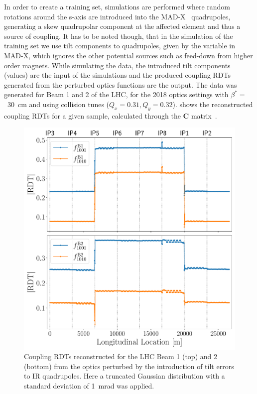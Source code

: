 In order to create a training set, simulations are performed where random rotations around the s-axis are introduced into the MAD-X~\cite{MADX_guide} quadrupoles, generating a skew quadrupolar component at the affected element and thus a source of coupling.
It has to be noted though, that in the simulation of the training set we use tilt components to quadrupoles, given by the \DPSI variable in MAD-X, which ignores the other potential sources such as feed-down from higher order magnets.
While simulating the data, the introduced tilt components (\DPSI values) are the input of the simulations and the produced coupling RDTs generated from the perturbed optics functions are the output.
The data was generated for Beam 1 and 2 of the LHC, for the 2018 optics settings with \(\beta^{*} =\)~\qty{30}{\centi\metre} and using collision tunes (\(Q_x = 0.31, Q_y = 0.32\)).
 shows the reconstructed coupling RDTs for a given sample, calculated through the \textbf{C} matrix~\cite{PRAB:Calaga:MergingHamiltonianMatrixApproches}.

\begin{figure}[!htb]
    \centering
    \includegraphics*[width=0.99\columnwidth]{Figures/Chapter5/example_coupling_rdts.pdf}
    \caption{Coupling RDTs reconstructed for the LHC Beam 1 (top) and 2 (bottom) from the optics perturbed by the introduction of tilt errors to IR quadrupoles. Here a truncated Gaussian distribution with a standard deviation of \qty{1}{\milli\radian} was applied.}
    \label{fig:example_coupling_rdts}
\end{figure}

